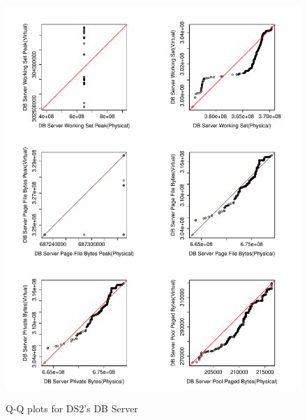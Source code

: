 \begin{figure}[tbh]
	\centering
	{\includegraphics[width=1.0\textwidth]{figures/appendix/qq_plots/DS2/DB_Server/Second_six.pdf}}
	\caption{Q-Q plots for DS2's DB Server}
\end{figure}


